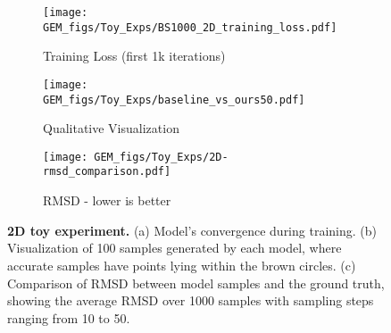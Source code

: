 \begin{figure}[H]
    \centering
    \begin{subfigure}[b]{0.32\textwidth} %
        \centering
        \texttt{[image: GEM\_figs/Toy\_Exps/BS1000\_2D\_training\_loss.pdf]}
        \caption{Training Loss (first 1k iterations)}
        \label{fig:training_loss_2D}
    \end{subfigure}
    \hfill
    \begin{subfigure}[b]{0.32\textwidth} %
        \centering
    \texttt{[image: GEM\_figs/Toy\_Exps/baseline\_vs\_ours50.pdf]}
        \caption{Qualitative Visualization}
        \label{fig:2D-qualitative}
    \end{subfigure}
    \hfill
    \begin{subfigure}[b]{0.32\textwidth} %
        \centering
    \texttt{[image: GEM\_figs/Toy\_Exps/2D-rmsd\_comparison.pdf]}
        \caption{RMSD - lower is better}
        \label{fig:2D-rmsd}
    \end{subfigure}
    \caption{\textbf{2D toy experiment.} (a) Model's convergence during training. (b) Visualization of 100 samples generated by each model, where accurate samples have points lying within the brown circles. (c) Comparison of RMSD between model samples and the ground truth, showing the average RMSD over 1000 samples with sampling steps ranging from 10 to 50.}
    \label{fig:2D-toy}
\end{figure}